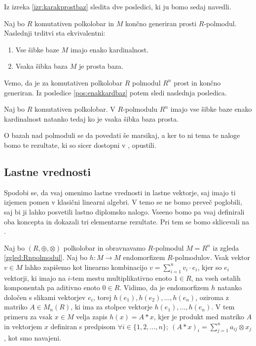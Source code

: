 \documentclass[mat1]{fmfdelo}
\newcommand{\map}[3]{\ensuremath{{#1}:{#2}\rightarrow{#3}}}
\begin{document}
Iz izreka \ref{izr:karakprostbaz} sledita dve posledici, ki ju bomo sedaj navedli.

\begin{posledica}\label{pos:enakkardbaz}
	Naj bo $R$ komutativen polkolobar in $M$ končno generiran prosti $R$-polmodul. Naslednji trditvi sta ekvivalentni: \begin{enumerate}
		\item Vse šibke baze $M$ imajo enako kardinalnost.
		\item Vsaka šibka baza $M$ je prosta baza.
	\end{enumerate}
\end{posledica}
Vemo, da je za komutativen polkolobar $R$ polmodul $R^n$ prost in končno generiran. Iz posledice \ref{pos:enakkardbaz} potem sledi naslednja posledica.
\begin{posledica}
	Naj bo $R$ komutativen polkolobar. V $R$-polmodulu $R^n$ imajo vse šibke baze enako kardinalnost natanko tedaj ko je vsaka šibka baza prosta.
\end{posledica}

O bazah nad polmoduli se da povedati še marsikaj, a ker to ni tema te naloge bomo te rezultate, ki so sicer dostopni v \cite{bib:Tanbase}, opustili.

\subsection{Lastne vrednosti}\label{subsect:eigen}
Spodobi se, da vsaj omenimo lastne vrednosti in lastne vektorje, saj imajo ti izjemen pomen v klasični linearni algebri. V temo se ne bomo preveč poglobili, saj bi ji lahko posvetili lastno diplomsko nalogo. Vseeno bomo pa vsaj definirali oba koncepta in dokazali tri elementarne rezultate. Pri tem se bomo sklicevali na \cite[poglavje 6]{bib:Gondran}.

Naj bo $(R, \oplus, \otimes)$ polkolobar in obravnavamo $R$-polmodul $M = R^n$ iz zgleda \ref{zgled:Rnpolmodul}. Naj bo $\map{h}{M}{M}$ endomorfizem $R$-polmodulov. Vsak vektor $v\in M$ lahko zapišemo kot linearno kombinacijo $v = \sum_{i = 1}^{n}v_i\cdot e_i$, kjer so $e_i$ vektorji, ki imajo na $i$-tem mestu multiplikativno enoto $1\in R$, na vseh ostalih komponentah pa aditivno enoto $0\in R$. Vidimo, da je endomorfizem $h$ natanko določen s slikami vektorjev $e_i$, torej $h(e_1), h(e_2), \ldots, h(e_n)$, oziroma z matriko $A\in M_n(R)$, ki ima za stolpce vektorje $h(e_1), \ldots, h(e_n)$. V tem primeru za vsak $x\in M$ velja zapis $h(x) = A*x$, kjer je produkt med matriko $A$ in vektorjem $x$ definiran s predpisom $\forall i\in \{1, 2, \ldots, n\};~(A*x)_i = \sum_{j = 1}^{n} a_{ij}\otimes x_j$, kot smo navajeni.
\end{document}
